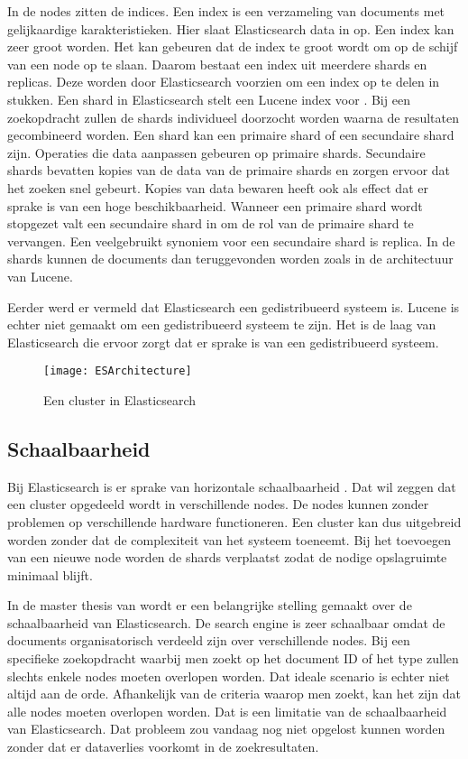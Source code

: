 In de nodes zitten de indices. Een index is een verzameling van documents met gelijkaardige karakteristieken. Hier slaat Elasticsearch data in op. Een index kan zeer groot worden. Het kan gebeuren dat de index te groot wordt om op de schijf van een node op te slaan. Daarom bestaat een index uit meerdere shards en replicas. Deze worden door Elasticsearch voorzien om een index op te delen in stukken. Een shard in Elasticsearch stelt een Lucene index voor \autocite{Brasetvik2017}. Bij een zoekopdracht zullen de shards individueel doorzocht worden waarna de resultaten gecombineerd worden. Een shard kan een primaire shard of een secundaire shard zijn. Operaties die data aanpassen gebeuren op primaire shards. Secundaire shards bevatten kopies van de data van de primaire shards en zorgen ervoor dat het zoeken snel gebeurt. Kopies van data bewaren heeft ook als effect dat er sprake is van een hoge beschikbaarheid. Wanneer een primaire shard wordt stopgezet valt een secundaire shard in om de rol van de primaire shard te vervangen. Een veelgebruikt synoniem voor een secundaire shard is replica. In de shards kunnen de documents dan teruggevonden worden zoals in de architectuur van Lucene.

Eerder werd er vermeld dat Elasticsearch een gedistribueerd systeem is. Lucene is echter niet gemaakt om een gedistribueerd systeem te zijn. Het is de laag van Elasticsearch die ervoor zorgt dat er sprake is van een gedistribueerd systeem.

\begin{figure}
	\centering
	\texttt{[image: ESArchitecture]}
	\caption{Een cluster in Elasticsearch}
	\label{fig:ESArchitecture}
\end{figure}

\subsection{Schaalbaarheid}

Bij Elasticsearch is er sprake van horizontale schaalbaarheid \autocite{Dixit2016}. Dat wil zeggen dat een cluster opgedeeld wordt in verschillende nodes. De nodes kunnen zonder problemen op verschillende hardware functioneren. Een cluster kan dus uitgebreid worden zonder dat de complexiteit van het systeem toeneemt. Bij het toevoegen van een nieuwe node worden de shards verplaatst zodat de nodige opslagruimte minimaal blijft.

In de master thesis van \textcite{Berglund2013} wordt er een belangrijke stelling gemaakt over de schaalbaarheid van Elasticsearch. De search engine is zeer schaalbaar omdat de documents organisatorisch verdeeld zijn over verschillende nodes. Bij een specifieke zoekopdracht waarbij men zoekt op het document ID of het type zullen slechts enkele nodes moeten overlopen worden. Dat ideale scenario is echter niet altijd aan de orde. Afhankelijk van de criteria waarop men zoekt, kan het zijn dat alle nodes moeten overlopen worden. Dat is een limitatie van de schaalbaarheid van Elasticsearch. Dat probleem zou vandaag nog niet opgelost kunnen worden zonder dat er dataverlies voorkomt in de zoekresultaten. 

